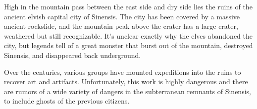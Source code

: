 High in the mountain pass between the east side and dry side lies the ruins of the ancient elvish capital city of Sinensis.
The city has been covered by a massive ancient rockslide, and the mountain peak above the crater has a large crater, weathered but still recognizable.
It's unclear exactly why the elves abandoned the city, but legends tell of a great monster that burst out of the mountain, destroyed Sinensis, and disappeared back underground.

Over the centuries, various groups have mounted expeditions into the ruins to recover art and artifacts.
Unfortunately, this work is highly dangerous and there are rumors of a wide variety of dangers in the subterranean remnants of Sinensis, to include ghosts of the previous citizens.
